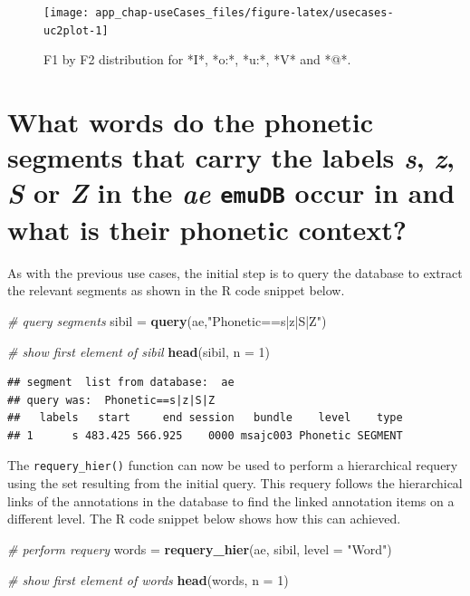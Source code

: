 \documentclass[]{book}
\newenvironment{Shaded}{\begin{snugshade}}{\end{snugshade}}
\newcommand{\CommentTok}[1]{\textcolor[rgb]{0.56,0.35,0.01}{\textit{#1}}}
\newcommand{\DataTypeTok}[1]{\textcolor[rgb]{0.13,0.29,0.53}{#1}}
\newcommand{\DecValTok}[1]{\textcolor[rgb]{0.00,0.00,0.81}{#1}}
\newcommand{\KeywordTok}[1]{\textcolor[rgb]{0.13,0.29,0.53}{\textbf{#1}}}
\newcommand{\NormalTok}[1]{#1}
\newcommand{\StringTok}[1]{\textcolor[rgb]{0.31,0.60,0.02}{#1}}
\begin{document}
\begin{figure}

{\centering \texttt{[image: app\_chap-useCases\_files/figure-latex/usecases-uc2plot-1]} 

}

\caption{F1 by F2 distribution for *I*, *o:*, *u:*, *V* and *@*.}\label{fig:usecases-uc2plot}
\end{figure}

\hypertarget{sec:app-chap-useCases-q3}{%
\section{\texorpdfstring{What words do the phonetic segments that carry the labels \emph{s}, \emph{z}, \emph{S} or \emph{Z} in the \emph{ae} \texttt{emuDB} occur in and what is their phonetic context?}{What words do the phonetic segments that carry the labels s, z, S or Z in the ae emuDB occur in and what is their phonetic context?}}\label{sec:app-chap-useCases-q3}}

As with the previous use cases, the initial step is to query the database to extract the relevant segments as shown in the R code snippet below.

\begin{Shaded}
\begin{Highlighting}[]
\CommentTok{# query segments}
\NormalTok{sibil =}\StringTok{ }\KeywordTok{query}\NormalTok{(ae,}\StringTok{"Phonetic==s|z|S|Z"}\NormalTok{)}

\CommentTok{# show first element of sibil}
\KeywordTok{head}\NormalTok{(sibil, }\DataTypeTok{n =} \DecValTok{1}\NormalTok{)}
\end{Highlighting}
\end{Shaded}

\begin{verbatim}
## segment  list from database:  ae 
## query was:  Phonetic==s|z|S|Z 
##   labels   start     end session   bundle    level    type
## 1      s 483.425 566.925    0000 msajc003 Phonetic SEGMENT
\end{verbatim}

The \texttt{requery\_hier()} function can now be used to perform a hierarchical requery using the set resulting from the initial query. This requery follows the hierarchical links of the annotations in the database to find the linked annotation items on a different level. The R code snippet below shows how this can achieved.

\begin{Shaded}
\begin{Highlighting}[]
\CommentTok{# perform requery}
\NormalTok{words =}\StringTok{ }\KeywordTok{requery_hier}\NormalTok{(ae, sibil, }\DataTypeTok{level =} \StringTok{"Word"}\NormalTok{)}

\CommentTok{# show first element of words}
\KeywordTok{head}\NormalTok{(words, }\DataTypeTok{n =} \DecValTok{1}\NormalTok{)}
\end{Highlighting}
\end{Shaded}
\end{document}

